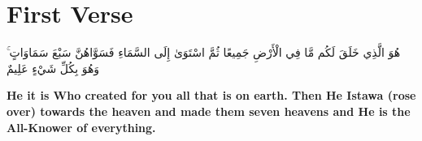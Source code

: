 \chapter{First Verse}
\begin{center}
    {\Huge    
        \begin{Arabic}
            هُوَ الَّذِي خَلَقَ لَكُم مَّا فِي الْأَرْضِ جَمِيعًا ثُمَّ اسْتَوَىٰ إِلَى السَّمَاءِ فَسَوَّاهُنَّ سَبْعَ سَمَاوَاتٍ ۚ وَهُوَ بِكُلِّ شَيْءٍ عَلِيمٌ
        \end{Arabic}
    }    
\end{center}

\begin{center}
    \Large \textbf{He it is Who created for you all that is on earth. Then He Istawa (rose over) towards the heaven and made them seven heavens and He is the All-Knower of everything.}
\end{center}
